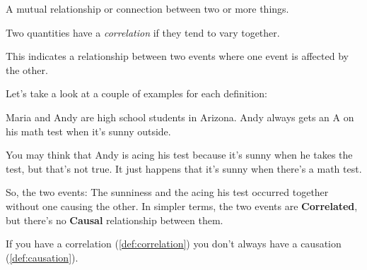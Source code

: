 \label{les_7_unit_1:identify_correlation_and_causation}

\begin{definition}[Correlation]
  \label{def:correlation}

  A mutual relationship or connection between two or more things.

  Two quantities have a \textit{correlation} if they tend to vary together.
\end{definition}

\begin{definition}[Causation]
  \label{def:causation}

  This indicates a relationship between two events where one event is affected
  by the other.
\end{definition}

Let's take a look at a couple of examples for each definition:

\begin{example}
  \label{exm:correlation_and_causation}

  Maria and Andy are high school students in Arizona. Andy always gets an A on
  his math test when it's sunny outside.

  You may think that Andy is acing his test because it's sunny when he takes the
  test, but that's not true. It just happens that it's sunny when there's a math
  test.

  So, the two events: The sunniness and the acing his test occurred together
  without one causing the other. In simpler terms, the two events are
  \textbf{Correlated}, but there's no \textbf{Causal} relationship between them.
\end{example}

\begin{note}
  \label{nte:correlation_and_causation_note}

  If you have a correlation (\ref{def:correlation}) you don't always have a
  causation (\ref{def:causation}).
\end{note}

\newpage
